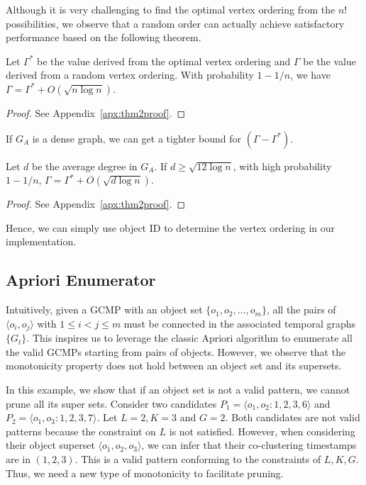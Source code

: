 Although it is very challenging to find the optimal vertex ordering from the $n!$ possibilities, we observe that a random order can actually achieve satisfactory performance based on the following theorem.


\begin{theorem}
\label{THM:SPM_LB}
Let $\Gamma^*$ be the value derived from the optimal vertex ordering and  $\Gamma$ be the value derived from a random vertex ordering. With probability $1-1/n$, we have $\Gamma = \Gamma^* + O(\sqrt{n \log n})$.
\end{theorem}
\begin{proof}
See Appendix~\ref{apx:thm2proof}.
\end{proof}
If $G_A$ is a dense graph, we can get a tighter bound for $(\Gamma - \Gamma^*)$.
\begin{theorem}
\label{THM:SPM_LB_INC}
Let $d$ be the average degree in $G_A$. If $d\geq \sqrt{12\log n}$, with
high probability $1-1/n$, $\Gamma = \Gamma^* + O(\sqrt{d\log n})$.
\end{theorem}
\begin{proof}
See Appendix~\ref{apx:thm2proof}.
\end{proof}
Hence, we can simply use object ID to determine the vertex ordering in our implementation.


\subsection{Apriori Enumerator}
Intuitively, given a GCMP with an object set $\{o_1,o_2,\ldots,o_m\}$, 
all the pairs of $\langle o_i,o_j \rangle$ with $1\leq i<j\leq m$ must 
be connected in the associated temporal graphs $\{G_t\}$. This inspires us to leverage the classic Apriori algorithm to enumerate all the valid GCMPs starting from pairs of objects. However, we observe that the monotonicity property does not hold between an object set and its supersets.

\begin{example}
In this example, we show that if an object set is not a valid pattern, we cannot prune all its super sets.
Consider two candidates $P_1=\langle o_1,o_2:1,2,3,6 \rangle$ and $P_2=\langle o_1,o_3:1,2,3,7 \rangle$. 
Let $L=2,K=3$ and $G=2$. Both candidates are not valid patterns because the constraint on $L$ is not satisfied. 
However, when considering their object superset $\langle o_1,o_2,o_3 \rangle$, we can infer that their co-clustering timestamps are in $(1,2,3)$. This is a valid pattern conforming to the constraints of $L,K,G$. Thus, we need a new type of monotonicity to facilitate pruning.
\end{example}   


